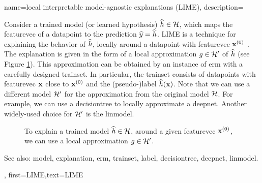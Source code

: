 {name={local interpretable model-agnostic explanations (LIME)},
 description={
		Consider 
		a trained \gls{model} (or learned \gls{hypothesis}) $\widehat{h} \in \mathcal{H}$, 
		which maps the \gls{featurevec} of a \gls{datapoint} to the \gls{prediction} $\widehat{y}= \widehat{h}$. 
		LIME is a technique for explaining the behavior of $\widehat{h}$, locally around a \gls{datapoint} with \gls{featurevec} ${\bf x}^{(0)}$ \cite{Ribeiro2016}. 
		The \gls{explanation} is given in the form of a local approximation $g \in \mathcal{H}'$ of $\widehat{h}$ 
		(see Figure \ref{fig_lime_dict}). This approximation can be obtained by an instance of \gls{erm} 
		with a carefully designed \gls{trainset}. In particular, the \gls{trainset} consists of \glspl{datapoint} 
		with \gls{featurevec} ${\bf x}$ close to ${\bf x}^{(0)}$ and the (pseudo-)\gls{label} $\widehat{h}({\bf x})$. 
		Note that we can use a different \gls{model} $\mathcal{H}'$ for the approximation from 
		the original \gls{model} $\mathcal{H}$. For example, we can use a \gls{decisiontree} 
		to locally approximate a \gls{deepnet}. Another widely-used choice for $\mathcal{H}'$ is 
		the \gls{linmodel}. 
		\begin{figure}[H]
		\begin{center}
		\end{center}
		\caption{To explain a trained \gls{model} $\widehat{h} \in \mathcal{H}$, around a 
		given \gls{featurevec} ${\bf x}^{(0)}$, we can use a local approximation $g \in \mathcal{H}'$. }
		\label{fig_lime_dict}
		\end{figure}
		See also: \gls{model}, \gls{explanation}, \gls{erm}, \gls{trainset}, \gls{label}, \gls{decisiontree}, \gls{deepnet}, \gls{linmodel}.},
	first={LIME},text={LIME}
}



